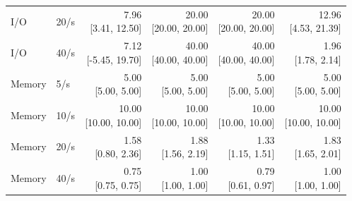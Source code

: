 \begin{table}[htbp]
\begin{tabular}{llrrrr}
I/O & 20/s & \shortstack{7.96\\{[3.41, 12.50]}} & \shortstack{20.00\\{[20.00, 20.00]}} & \shortstack{20.00\\{[20.00, 20.00]}} & \shortstack{12.96\\{[4.53, 21.39]}}\\[3pt]
I/O & 40/s & \shortstack{7.12\\{[-5.45, 19.70]}} & \shortstack{40.00\\{[40.00, 40.00]}} & \shortstack{40.00\\{[40.00, 40.00]}} & \shortstack{1.96\\{[1.78, 2.14]}}\\[3pt]
Memory & 5/s & \shortstack{5.00\\{[5.00, 5.00]}} & \shortstack{5.00\\{[5.00, 5.00]}} & \shortstack{5.00\\{[5.00, 5.00]}} & \shortstack{5.00\\{[5.00, 5.00]}}\\[3pt]
Memory & 10/s & \shortstack{10.00\\{[10.00, 10.00]}} & \shortstack{10.00\\{[10.00, 10.00]}} & \shortstack{10.00\\{[10.00, 10.00]}} & \shortstack{10.00\\{[10.00, 10.00]}}\\[3pt]
Memory & 20/s & \shortstack{1.58\\{[0.80, 2.36]}} & \shortstack{1.88\\{[1.56, 2.19]}} & \shortstack{1.33\\{[1.15, 1.51]}} & \shortstack{1.83\\{[1.65, 2.01]}}\\[3pt]
Memory & 40/s & \shortstack{0.75\\{[0.75, 0.75]}} & \shortstack{1.00\\{[1.00, 1.00]}} & \shortstack{0.79\\{[0.61, 0.97]}} & \shortstack{1.00\\{[1.00, 1.00]}}\\[3pt]
\bottomrule\end{tabular}\end{table}

